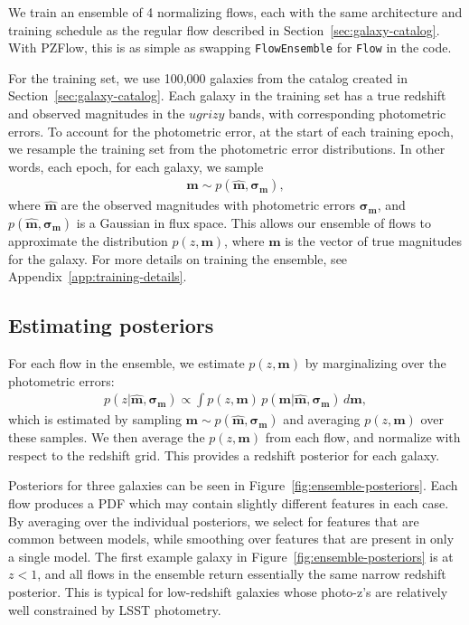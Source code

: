 \documentclass[twocolumn,twocolappendix]{aastex631}
\begin{document}
We train an ensemble of 4 normalizing flows, each with the same architecture and training schedule as the regular flow described in Section~\ref{sec:galaxy-catalog}.
With PZFlow, this is as simple as swapping \texttt{FlowEnsemble} for \texttt{Flow} in the code.

For the training set, we use 100,000 galaxies from the catalog created in Section~\ref{sec:galaxy-catalog}.
Each galaxy in the training set has a true redshift and observed magnitudes in the $ugrizy$ bands, with corresponding photometric errors.
To account for the photometric error, at the start of each training epoch, we resample the training set from the photometric error distributions.
In other words, each epoch, for each galaxy, we sample
\begin{align}
    \mathbf{m} \sim p(\mathbf{\hat{m}}, \mathbf{\sigma_m}),
\end{align}
where $\mathbf{\hat{m}}$ are the observed magnitudes with photometric errors $\mathbf{\sigma_m}$, and $p(\mathbf{\hat{m}}, \mathbf{\sigma_m})$ is a Gaussian in flux space.
This allows our ensemble of flows to approximate the distribution $p(z, \mathbf{m})$, where $\mathbf{m}$ is the vector of true magnitudes for the galaxy.
For more details on training the ensemble, see Appendix~\ref{app:training-details}.


\subsection{Estimating posteriors}

For each flow in the ensemble, we estimate $p(z, \mathbf{m})$ by marginalizing over the photometric errors:
\begin{align}
    p(z| \mathbf{\hat{m}}, \mathbf{\sigma_m}) \propto \int p(z, \mathbf{m}) \, p(\mathbf{m}| \mathbf{\hat{m}}, \mathbf{\sigma_m}) \, d\mathbf{m},
\end{align}
which is estimated by sampling $\mathbf{m} \sim p(\mathbf{\hat{m}}, \mathbf{\sigma_m})$ and averaging $p(z, \mathbf{m})$ over these samples.
We then average the $p(z, \mathbf{m})$ from each flow, and normalize with respect to the redshift grid.
This provides a redshift posterior for each galaxy.

Posteriors for three galaxies can be seen in Figure~\ref{fig:ensemble-posteriors}.
Each flow produces a PDF which may contain slightly different features in each case.
By averaging over the individual posteriors, we select for features that are common between models, while smoothing over features that are present in only a single model.
The first example galaxy in Figure~\ref{fig:ensemble-posteriors} is at $z < 1$, and all flows in the ensemble return essentially the same narrow redshift posterior.
This is typical for low-redshift galaxies whose photo-z's are relatively well constrained by LSST photometry.
\end{document}
